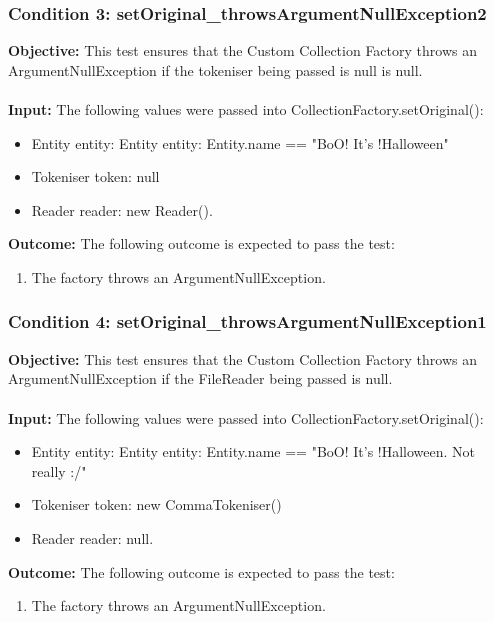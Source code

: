 \documentclass[a4paper,12pt]{article}
\begin{document}
		\subsubsection{Condition 3: setOriginal\_throwsArgumentNullException2}
			\textbf{Objective:} This test ensures that the Custom Collection Factory throws an ArgumentNullException if the tokeniser being passed is null is null.\\\\
			\textbf{Input:} The following values were passed into CollectionFactory.setOriginal():
				\begin{itemize}
					\item Entity entity: Entity entity: Entity.name == "BoO! It's !Halloween"
					\item Tokeniser token: null
					\item Reader reader: new Reader().
				\end{itemize}
			\textbf{Outcome:} The following outcome is expected to pass the test:
				\begin{enumerate}
					\item The factory throws an ArgumentNullException.
				\end{enumerate}
		\subsubsection{Condition 4: setOriginal\_throwsArgumentNullException1}
			\textbf{Objective:} This test ensures that the Custom Collection Factory throws an ArgumentNullException if the FileReader being passed is null.\\\\
			\textbf{Input:} The following values were passed into CollectionFactory.setOriginal():
				\begin{itemize}
					\item Entity entity: Entity entity: Entity.name == "BoO! It's !Halloween. Not really :/"
					\item Tokeniser token: new CommaTokeniser()
					\item Reader reader: null.
				\end{itemize}
			\textbf{Outcome:} The following outcome is expected to pass the test:
				\begin{enumerate}
					\item The factory throws an ArgumentNullException.
				\end{enumerate}
\end{document}
